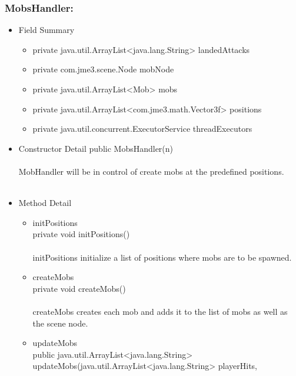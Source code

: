 \documentclass[letterpaper]{article}
\begin{document}
						\vspace{0.2in}
						\subsubsection*{MobsHandler:}
						\vspace{0.1in}
							\begin{itemize}
								\item	Field Summary
										\begin{itemize}
											\item	private java.util.ArrayList<java.lang.String>	landedAttacks 
											\item	private com.jme3.scene.Node	mobNode 
											\item	private java.util.ArrayList<Mob>	mobs 
											\item	private java.util.ArrayList<com.jme3.math.Vector3f>	positions 
											\item	private java.util.concurrent.ExecutorService	threadExecutors 
										\end{itemize}
								\item	Constructor Detail
										public MobsHandler(n) \\ \\
										MobHandler will be in control of create mobs at the predefined positions. \\ \\
								\item	Method Detail
										\begin{itemize}
											\item	initPositions \\
													private void initPositions() \\ \\
													initPositions initialize a list of positions where mobs are to be spawned.
											\item	createMobs \\
													private void createMobs() \\ \\
													createMobs creates each mob and adds it to the list of mobs as well as the scene node. \\
											\item	updateMobs \\
													public java.util.ArrayList<java.lang.String> updateMobs(java.util.ArrayList<java.lang.String> playerHits,

\end{itemize}
\end{itemize}
\end{document}
